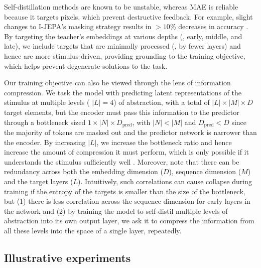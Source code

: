 Self-distillation methods are known to be unstable, whereas MAE is reliable because it targets pixels, which prevent destructive feedback. 
For example, slight changes to I-JEPA's masking strategy results in ${>}10$\% decreases in accuracy \citep{assran2023ijepa}.
By targeting the teacher's embeddings at various depths (\eg{}, early, middle, and late), we include targets that are minimally processed (\ie{}, by fewer layers) and hence are more stimulus-driven, providing grounding to the training objective, which helps prevent degenerate solutions to the task.

Our training objective can also be viewed through the lens of information compression.
We task the model with predicting latent representations of the stimulus at multiple levels (\eg{} $|L|=4$) of abstraction, with a total of $|L|\times |M| \times D$ target elements, but the encoder must pass this information to the predictor through a bottleneck sized $1 \times |N| \times D_\text{pred}$, with $|N| < |M|$ and $D_\text{pred} < D$ since the majority of tokens are masked out and the predictor network is narrower than the encoder.
By increasing $|L|$, we increase the bottleneck ratio and hence increase the amount of compression it must perform, which is only possible if it understands the stimulus sufficiently well \citep{tishby2000informationbottleneckmethod}.
Moreover, note that there can be redundancy across both the embedding dimension ($D$), sequence dimension ($M$) and the target layers ($L$).
Intuitively, such correlations can cause collapse during training if the entropy of the targets is smaller than the size of the bottleneck, but (1) there is less correlation across the sequence dimension for early layers in the network \citep{park2023what, Raghu2021doViTsSeeCNNs}
and (2) 
by training the model to self-distil multiple levels of abstraction into its own output layer, we ask it to compress the information from all these levels into the space of a single layer, repeatedly.

\subsection{Illustrative experiments}
\label{sec:bridging-exps}



